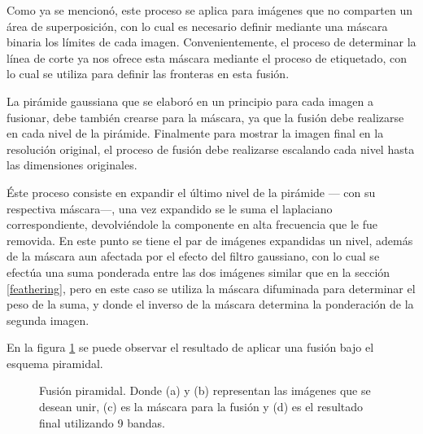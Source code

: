 Como ya se mencionó, este proceso se aplica para imágenes que no comparten un área de superposición, con lo cual es necesario definir mediante una máscara binaria los límites de cada imagen. Convenientemente, el proceso de determinar la línea de corte ya nos ofrece esta máscara mediante el proceso de etiquetado, con lo cual se utiliza para definir las fronteras en esta fusión.

La pirámide gaussiana que se elaboró en un principio para cada imagen a fusionar, debe también crearse para la máscara, ya que la fusión debe realizarse en cada nivel de la pirámide. Finalmente para mostrar la imagen final en la resolución original, el proceso de fusión debe realizarse escalando cada nivel hasta las dimensiones originales.

Éste proceso consiste en expandir el último nivel de la pirámide --- con su respectiva máscara---, una vez expandido se le suma el laplaciano correspondiente, devolviéndole la componente en alta frecuencia que le fue removida. En este punto se tiene el par de imágenes expandidas un nivel, además de la máscara aun afectada por el efecto del filtro gaussiano, con lo cual se efectúa una suma ponderada entre las dos imágenes similar que en la sección \ref{feathering}, pero en este caso se utiliza la máscara difuminada para determinar el peso de la suma, y donde el inverso de la máscara determina la ponderación de la segunda imagen.

En la figura \ref{imagen:blend-apple} se puede observar el resultado de aplicar una fusión bajo el esquema piramidal.

\begin{figure}[H]
	\centering     %
	
	
	\caption[Ejemplo de fusión pirámidal]{Fusión piramidal. Donde (a) y (b) representan las imágenes que se desean unir, (c) es la máscara para la fusión y (d) es el resultado final utilizando 9 bandas\protect\footnotemark.}
	\label{imagen:blend-apple}
\end{figure}

